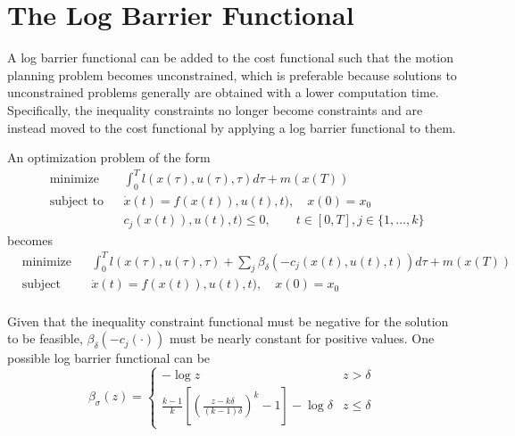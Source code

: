 \section{The Log Barrier Functional}
\label{sec:logbarrierfunc}

\par A log barrier functional can be added to the cost functional such that the motion planning problem becomes unconstrained, which is preferable because solutions to unconstrained problems generally are obtained with a lower computation time. Specifically, the inequality constraints no longer become constraints and are instead moved to the cost functional by applying a log barrier functional to them.
\par An optimization problem of the form 
\begin{equation}
    \label{eq:opt_prob_without_log_bar}
    \begin{aligned}
    & \text{minimize} && \int_0^T l(x(\tau),u(\tau),\tau)d\tau + m(x(T)) \\
    & \text{subject to}  && \dot{x}(t) = f(x(t)),u(t),t),\quad x(0)=x_0 \\
        & && c_j(x(t)),u(t),t)\leq 0, \qquad t\in [0,T],j\in \{1,\dots,k \}
    \end{aligned}
\end{equation}
becomes
\begin{equation}
    \label{eq:opt_prob_with_log_bar}
    \begin{aligned}
    & \text{minimize} && \int_0^T l(x(\tau),u(\tau),\tau)+\sum_j \beta_\delta(-c_j(x(t),u(t),t))d\tau + m(x(T)) \\
    & \text{subject to}  && \dot{x}(t) = f(x(t)),u(t),t),\quad x(0)=x_0 \\
    \end{aligned}
\end{equation}
\par Given that the inequality constraint functional must be negative for the solution to be feasible, $\beta_\delta(-c_j(\cdot))$ must be nearly constant for positive values. One possible log barrier functional can be
\begin{equation}
    \beta_\sigma (z) = 
    \begin{cases}
        -\log{} z & z>\delta \\
        \frac{k-1}{k}\left[\left(\frac{z-k\delta}{(k-1)\delta}\right)^k-1\right]-\log{}\delta & z\leq \delta
    \end{cases}
\end{equation}

